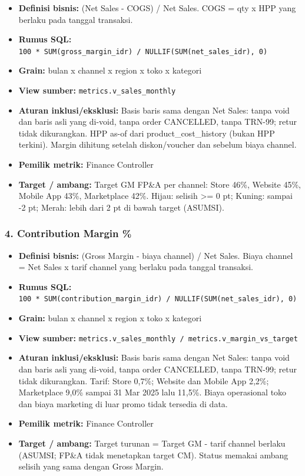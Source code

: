 \documentclass[10pt,a4paper]{article}
\providecommand{\tightlist}{\setlength{\itemsep}{1pt}\setlength{\parskip}{0pt}}
\begin{document}
\begin{itemize}
\tightlist
\item
  \textbf{Definisi bisnis:} (Net Sales - COGS) / Net Sales. COGS = qty x HPP yang berlaku pada tanggal transaksi.
\item
  \textbf{Rumus SQL:} \texttt{100\ *\ SUM(gross\_\allowbreak{}margin\_\allowbreak{}idr)\ /\ NULLIF(SUM(net\_\allowbreak{}sales\_\allowbreak{}idr),\ 0)}
\item
  \textbf{Grain:} bulan x channel x region x toko x kategori
\item
  \textbf{View sumber:} \texttt{metrics.v\_\allowbreak{}sales\_\allowbreak{}monthly}
\item
  \textbf{Aturan inklusi/eksklusi:} Basis baris sama dengan Net Sales: tanpa void dan baris asli yang di-void, tanpa order CANCELLED, tanpa TRN-99; retur tidak dikurangkan. HPP as-of dari product\_\allowbreak{}cost\_\allowbreak{}history (bukan HPP terkini). Margin dihitung setelah diskon/voucher dan sebelum biaya channel.
\item
  \textbf{Pemilik metrik:} Finance Controller
\item
  \textbf{Target / ambang:} Target GM FP\&A per channel: Store 46\%, Website 45\%, Mobile App 43\%, Marketplace 42\%. Hijau: selisih \textgreater= 0 pt; Kuning: sampai -2 pt; Merah: lebih dari 2 pt di bawah target (ASUMSI).
\end{itemize}

\subsubsection{4. Contribution Margin \%}\label{contribution-margin}

\begin{itemize}
\tightlist
\item
  \textbf{Definisi bisnis:} (Gross Margin - biaya channel) / Net Sales. Biaya channel = Net Sales x tarif channel yang berlaku pada tanggal transaksi.
\item
  \textbf{Rumus SQL:} \texttt{100\ *\ SUM(contribution\_\allowbreak{}margin\_\allowbreak{}idr)\ /\ NULLIF(SUM(net\_\allowbreak{}sales\_\allowbreak{}idr),\ 0)}
\item
  \textbf{Grain:} bulan x channel x region x toko x kategori
\item
  \textbf{View sumber:} \texttt{metrics.v\_\allowbreak{}sales\_\allowbreak{}monthly\ /\ metrics.v\_\allowbreak{}margin\_\allowbreak{}vs\_\allowbreak{}target}
\item
  \textbf{Aturan inklusi/eksklusi:} Basis baris sama dengan Net Sales: tanpa void dan baris asli yang di-void, tanpa order CANCELLED, tanpa TRN-99; retur tidak dikurangkan. Tarif: Store 0,7\%; Website dan Mobile App 2,2\%; Marketplace 9,0\% sampai 31 Mar 2025 lalu 11,5\%. Biaya operasional toko dan biaya marketing di luar promo tidak tersedia di data.
\item
  \textbf{Pemilik metrik:} Finance Controller
\item
  \textbf{Target / ambang:} Target turunan = Target GM - tarif channel berlaku (ASUMSI; FP\&A tidak menetapkan target CM). Status memakai ambang selisih yang sama dengan Gross Margin.
\end{itemize}
\end{document}
